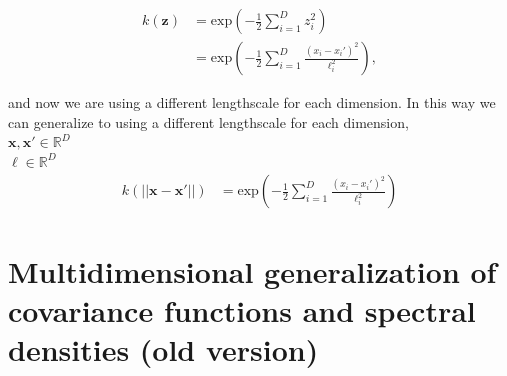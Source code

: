 \documentclass[]{interact}
\theoremstyle{plain}%
\theoremstyle{definition}
\theoremstyle{remark}
\begin{document}
\begin{enumerate}
	\begin{align*}
	k(\mathbf{z}) &=\mathrm{exp}\left(-\frac{1}{2} \sum_{i=1}^{D}z_i^2 \right)\\
	&=\mathrm{exp}\left(-\frac{1}{2} \sum_{i=1}^{D}\frac{(x_i-x_i')^2}{\ell_i^2} \right),
	\end{align*}
	
	\noindent and now we are using a different lengthscale for each dimension. In this way we can generalize to using a different lengthscale for each dimension,\\
	
	\noindent $\mathbf{x}, \mathbf{x}' \in \mathbb{R}^D$\\
	$\boldsymbol{\ell} \in \mathbb{R}^D$\\
	
	\begin{align*}
	k(||\mathbf{x}-\mathbf{x}'||) &= \mathrm{exp}\left(-\frac{1}{2} \sum_{i=1}^{D}\frac{(x_i-x_i')^2}{\ell_i^2} \right)
	\end{align*}
	

\end{enumerate}

\section{Multidimensional generalization of covariance functions and spectral densities (old version)}
\end{document}
